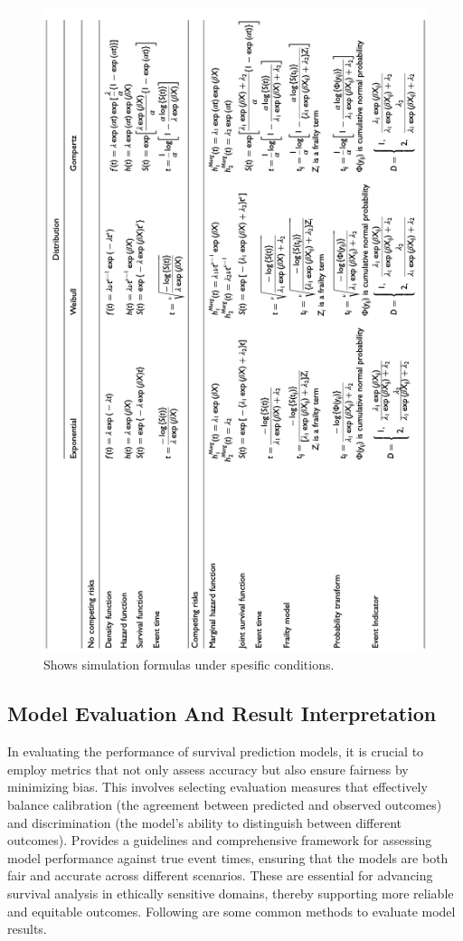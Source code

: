 \begin{figure}[h]
    \centering
    \includegraphics[scale=0.56 , angle=270]{Figures/COMPETING1.png}
    \caption{\parencite{meng_simulating_2023} Shows simulation formulas under spesific conditions.}
\end{figure}
\subsection{Model Evaluation And Result Interpretation} \label{eval}
In evaluating the performance of survival prediction models, it is crucial to employ metrics that not only assess accuracy but also ensure fairness by minimizing bias. This involves selecting evaluation measures that effectively balance calibration (the agreement between predicted and observed outcomes) and discrimination (the model's ability to distinguish between different outcomes). \parencite{sonabend_flexible_2022} Provides a guidelines and comprehensive framework for assessing model performance against true event times, ensuring that the models are both fair and accurate across different scenarios. These are essential for advancing survival analysis in ethically sensitive domains, thereby supporting more reliable and equitable outcomes. Following are some common methods to evaluate model results.


